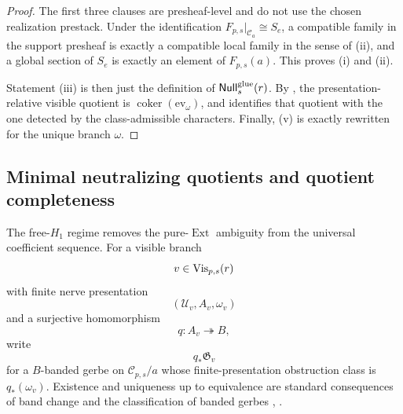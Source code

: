 \begin{proof}
The first three clauses are presheaf-level and do not use the chosen realization prestack. Under the identification $F_{p,s}|_{\mathcal C_a}\cong S_e$, a compatible family in the support presheaf is exactly a compatible local family in the sense of (ii), and a global section of $S_e$ is exactly an element of $F_{p,s}(a)$. This proves \textup{(i)} and \textup{(ii)}.

Statement \textup{(iii)} is then just the definition of $\mathsf{Null}^{\mathrm{glue}}_s(r)$. By , the presentation-relative visible quotient is $\operatorname{coker}(\mathrm{ev}_{\omega})$, and  identifies that quotient with the one detected by the class-admissible characters. Finally, \textup{(v)} is exactly  rewritten for the unique branch $\omega$.
\end{proof}

\subsection{Minimal neutralizing quotients and quotient completeness}

The free-$H_1$ regime removes the pure-$\operatorname{Ext}$ ambiguity from the universal coefficient sequence. For a visible branch
\[
v\in \mathrm{Vis}_{p,s}(r)
\]
with finite nerve presentation
\[
(\mathcal U_v,A_v,\omega_v)
\]
and a surjective homomorphism
\[
q:A_v\twoheadrightarrow B,
\]
write
\[
q_*\mathfrak G_v
\]
for a $B$-banded gerbe on $\mathcal C_{p,s}/a$ whose finite-presentation obstruction class is $q_*(\omega_v)$. Existence and uniqueness up to equivalence are standard consequences of band change and the classification of banded gerbes \cite[Chap.~IV]{Giraud1971}, \cite[Tag 06NY]{StacksProject}.

